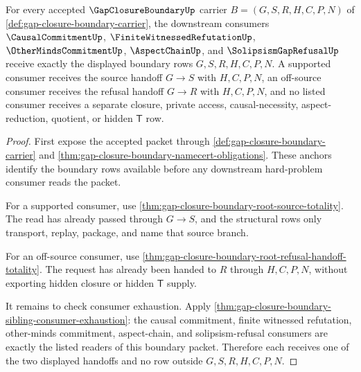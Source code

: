 \begin{theorem}
\label{thm:gap-closure-boundary-root-consumer-handoff}
For every accepted $\GapClosureBoundaryUp$ carrier $B=(G,S,R,H,C,P,N)$ of \autoref{def:gap-closure-boundary-carrier}, the downstream consumers $\CausalCommitmentUp$, $\FiniteWitnessedRefutationUp$, $\OtherMindsCommitmentUp$, $\AspectChainUp$, and $\SolipsismGapRefusalUp$ receive exactly the displayed boundary rows $G,S,R,H,C,P,N$. A supported consumer receives the source handoff $G \longrightarrow S$ with $H,C,P,N$, an off-source consumer receives the refusal handoff $G \longrightarrow R$ with $H,C,P,N$, and no listed consumer receives a separate closure, private access, causal-necessity, aspect-reduction, quotient, or hidden $\mathsf{T}$ row.
\end{theorem}
\begin{proof}
First expose the accepted packet through \autoref{def:gap-closure-boundary-carrier} and \autoref{thm:gap-closure-boundary-namecert-obligations}. These anchors identify the boundary rows available before any downstream hard-problem consumer reads the packet.

For a supported consumer, use \autoref{thm:gap-closure-boundary-root-source-totality}. The read has already passed through $G \longrightarrow S$, and the structural rows only transport, replay, package, and name that source branch.

For an off-source consumer, use \autoref{thm:gap-closure-boundary-root-refusal-handoff-totality}. The request has already been handed to $R$ through $H,C,P,N$, without exporting hidden closure or hidden $\mathsf{T}$ supply.

It remains to check consumer exhaustion. Apply \autoref{thm:gap-closure-boundary-sibling-consumer-exhaustion}: the causal commitment, finite witnessed refutation, other-minds commitment, aspect-chain, and solipsism-refusal consumers are exactly the listed readers of this boundary packet. Therefore each receives one of the two displayed handoffs and no row outside $G,S,R,H,C,P,N$.
\end{proof}
